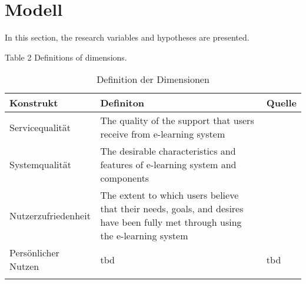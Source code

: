 \section{Modell}
\label{sec:modell}

In this section, the research variables and hypotheses are presented.


Table 2
Definitions of dimensions.

\begin{table}[ht] 
\footnotesize
\caption{Definition der Dimensionen}
\label{tab:Dimensionen} 
\begin{tabular}{@{}lp{9cm}l@{}} \toprule

\textbf{Konstrukt} & \textbf{Definiton} & \textbf{Quelle} \\ \midrule



Servicequalität & The quality of the support that users receive from e-learning system & \parbox[t]{4cm}{\cite{petter2008measuring}}\\ 
Systemqualität & The desirable characteristics and features of e-learning system and components & \parbox[t]{4cm}{\cite{petter2008measuring}}\\ Nutzerzufriedenheit & The extent to which users believe that their needs, goals, and desires have been fully met through using the e-learning system & \parbox[t]{4cm}{\cite{sanchez2009moderating}}\\ 
Persönlicher Nutzen & \parbox[t]{9cm}{tbd}  & \parbox[t]{4cm}{tbd} \\ \addlinespace 
  \bottomrule

\end{tabular}	
\end{table}



